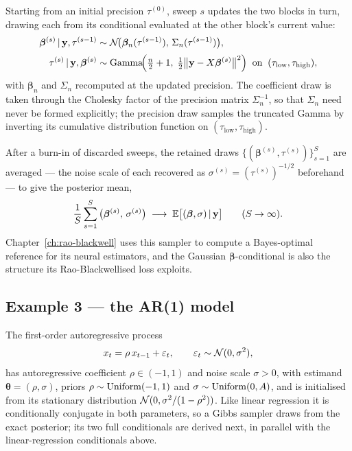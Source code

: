 Starting from an initial precision $\tau^{(0)}$, sweep $s$ updates the
two blocks in turn, drawing each from its conditional evaluated at the
other block's current value:
%
\begin{align}
  \bm{\beta}^{(s)} \,|\, \mathbf{y}, \tau^{(s-1)}
  &\sim
  \mathcal{N}\!\big(\bm{\beta}_n(\tau^{(s-1)}),\,
  \Sigma_n(\tau^{(s-1)})\big),
  \label{eq:lr-gibbs-beta}\\[2pt]
  \tau^{(s)} \,|\, \mathbf{y}, \bm{\beta}^{(s)}
  &\sim
  \text{Gamma}\!\Big(\tfrac{n}{2} + 1,\;
  \tfrac{1}{2}\big\|\mathbf{y} - X\bm{\beta}^{(s)}\big\|^2\Big)
  \;\;\text{on}\;\; (\tau_{\text{low}}, \tau_{\text{high}}),
  \label{eq:lr-gibbs-tau}
\end{align}
%
with $\bm{\beta}_n$ and $\Sigma_n$ recomputed at the updated precision.
The coefficient draw is taken through the Cholesky factor of the
precision matrix $\Sigma_n^{-1}$, so that $\Sigma_n$ need never be
formed explicitly; the precision draw samples the truncated Gamma by
inverting its cumulative distribution function on
$(\tau_{\text{low}}, \tau_{\text{high}})$.

After a burn-in of discarded sweeps, the retained draws
$\{(\bm{\beta}^{(s)}, \tau^{(s)})\}_{s=1}^{S}$ are averaged --- the
noise scale of each recovered as $\sigma^{(s)} = (\tau^{(s)})^{-1/2}$
beforehand --- to give the posterior mean,
%
\begin{equation}
  \frac{1}{S}\sum_{s=1}^{S}
  \big(\bm{\beta}^{(s)},\, \sigma^{(s)}\big)
  \;\longrightarrow\;
  \mathbb{E}\big[(\bm{\beta}, \sigma) \,|\, \mathbf{y}\big]
  \qquad (S \to \infty).
  \label{eq:lr-gibbs-postmean}
\end{equation}
%
Chapter~\ref{ch:rao-blackwell} uses this sampler to compute a
Bayes-optimal reference for its neural estimators, and the Gaussian
$\bm{\beta}$-conditional is also the structure its Rao-Blackwellised
loss exploits.

\subsection{Example 3 --- the AR(1) model}
\label{sec:cs-ar1}

The first-order autoregressive process
%
\begin{equation}
  x_t = \rho\,x_{t-1} + \varepsilon_t,
  \qquad
  \varepsilon_t \sim \mathcal{N}(0, \sigma^2),
  \label{eq:ar1}
\end{equation}
%
has autoregressive coefficient $\rho \in (-1, 1)$ and noise scale
$\sigma > 0$, with estimand $\bm{\theta} = (\rho, \sigma)$, priors
$\rho \sim \mathrm{Uniform}(-1, 1)$ and $\sigma \sim \mathrm{Uniform}(0, A)$, and is
initialised from its stationary distribution
$\mathcal{N}(0, \sigma^2/(1-\rho^2))$. Like linear regression it is
conditionally conjugate in both parameters, so a Gibbs sampler draws
from the exact posterior; its two full conditionals are derived next,
in parallel with the linear-regression conditionals above.

